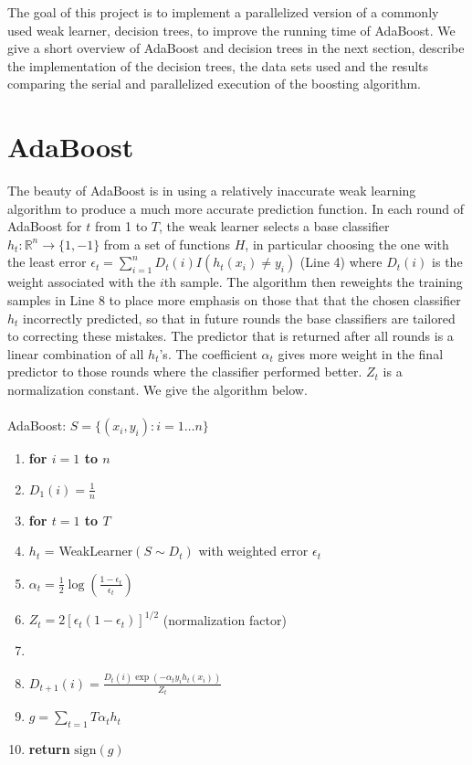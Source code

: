 \documentclass[12pt]{article}
\begin{document}
The goal of this project is to implement a parallelized version of a commonly
used weak learner, decision trees, to improve the running time of AdaBoost. We
give a short overview of AdaBoost and decision trees in the next section,
describe the implementation of the decision trees, the data sets used and the
results comparing the serial and parallelized execution of the boosting algorithm. 

\section{AdaBoost} The beauty of AdaBoost is in using a relatively inaccurate
weak learning algorithm to produce a much more accurate prediction function. In
each round of AdaBoost for $t$ from 1 to $T$, the weak learner selects a
base classifier $h_t: \mathbb{R}^n\rightarrow\{1,-1\}$ from a set of functions
$H$, in particular choosing the one with the least error
$\epsilon_t=\sum_{i=1}^{n}D_t(i)I(h_t(x_i)\neq y_i)$ (Line 4) where $D_t(i)$ is
the weight associated with the $i$th sample. The algorithm then reweights the
training samples in Line 8 to place more emphasis on those that that the chosen
classifier $h_t$ incorrectly predicted, so that in future rounds the base
classifiers are tailored to correcting these mistakes. The predictor that is
returned after all rounds is a linear combination of all $h_t$'s. The
coefficient $\alpha_t$ gives more weight in the final predictor to those rounds
where the classifier performed better. $Z_t$ is a normalization constant. We
give the algorithm below.\\ \\
{\sc AdaBoost}: $S = \{(x_i,y_i):i = 1\ldots n\}$
\begin{enumerate}
\itemsep1pt \parskip0pt 
\item {\bf for $i=1$ to $n$}
\item \quad $D_1(i) = \frac{1}{n}$
\item {\bf for $t=1$ to $T$}
\item \quad $h_t$ = {\sc WeakLearner}$(S\sim D_t)$ with weighted error $\epsilon_t$
\item \quad $\alpha_t = \frac{1}{2}\log(\frac{1-\epsilon_t}{\epsilon_t})$
\item \quad $Z_t = 2[\epsilon_t(1-\epsilon_t)]^{1/2}$ (normalization factor)
\item {}
\item \quad \quad $D_{t+1}(i) = \frac{D_t(i)\exp(-\alpha_t y_i h_t(x_i))}{Z_t}$
\item $g = \sum_{t=1}{T} \alpha_t h_t$
\item {\bf return} $\mbox{sign}(g)$
\end{enumerate}
\end{document}
